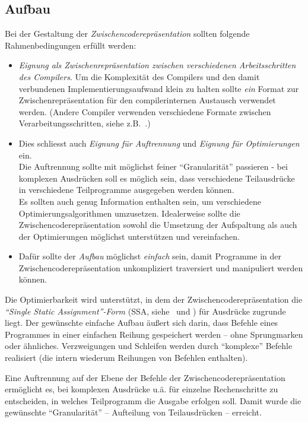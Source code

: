 \documentclass[twoside,a4paper,fleqn,12pt]{book}
\begin{document}
\subsection{Aufbau}

Bei der Gestaltung der \emph{Zwischencoderepräsentation} sollten folgende Rahmenbedingungen erfüllt werden:
\begin{itemize}
\item \emph{Eignung als Zwischenrepräsentation zwischen verschiedenen Arbeitsschritten des Compilers}.
Um die Komplexität des Compilers und den damit verbundenen Implementierungsaufwand klein zu halten
sollte \emph{ein} Format zur Zwischenrepräsentation für den compilerinternen Austausch verwendet werden.
(Andere Compiler verwenden verschiedene Formate zwischen Verarbeitungsschritten, siehe z.B.~\cite{SIMPLE}.)
\item Dies schliesst auch \emph{Eignung für Auftrennung} und \emph{Eignung für Optimierungen} ein.\\
Die Auftrennung sollte mit möglichst feiner "`Granularität"' passieren - bei komplexen Ausdrücken soll es möglich sein,
dass verschiedene Teilausdrücke in verschiedene Teilprogramme ausgegeben werden können.\\
Es sollten auch genug Information enthalten sein, um verschiedene Optimierungsalgorithmen umzusetzen.
Idealerweise sollte die Zwischencoderepräsentation sowohl die Umsetzung der Aufspaltung als auch 
der Optimierungen möglichst unterstützen und vereinfachen.
\item Dafür sollte der \emph{Aufbau} möglichst \emph{einfach} sein, damit Programme in der Zwischencoderepräsentation 
unkompliziert traversiert und manipuliert werden können.
\end{itemize}

Die Optimierbarkeit wird unterstützt, in dem der Zwischencoderepräsentation die \emph{``Single Static Assignment''-Form} (SSA, siehe~\cite{ssa1} und \cite{ssa2})
für Ausdrücke zugrunde liegt. Der gewünschte einfache Aufbau äußert sich darin, dass Befehle eines Programmes
in einer einfachen Reihung gespeichert werden -- ohne Sprungmarken oder ähnliches. Verzweigungen und Schleifen werden
durch "`komplexe"' Befehle realisiert (die intern wiederum Reihungen von Befehlen enthalten).

Eine Auftrennung auf der Ebene der Befehle der Zwischencoderepräsentation ermöglicht es, bei komplexen Ausdrücke u.ä.
für einzelne Rechenschritte zu entscheiden, in welches Teilprogramm die Ausgabe erfolgen soll.
Damit wurde die gewünschte "`Granularität"' -- Aufteilung von Teilausdrücken -- erreicht.
\end{document}
